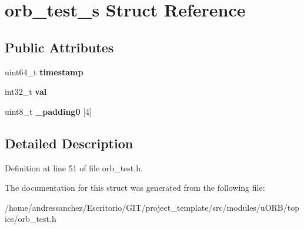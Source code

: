 \hypertarget{structorb__test__s}{}\section{orb\+\_\+test\+\_\+s Struct Reference}
\label{structorb__test__s}
\subsection*{Public Attributes}
\begin{DoxyCompactItemize}
\item 
\mbox{\label{structorb__test__s_a5def43d9b1795f9f5cc367f091d01c10}} 
uint64\+\_\+t {\bfseries timestamp}
\item 
\mbox{\label{structorb__test__s_a7ca7d4e30e3c1d5512222ea29d192dd1}} 
int32\+\_\+t {\bfseries val}
\item 
\mbox{\label{structorb__test__s_a43eb923766090656a5e6a5e4624359d9}} 
uint8\+\_\+t {\bfseries \+\_\+padding0} \mbox{[}4\mbox{]}
\end{DoxyCompactItemize}


\subsection{Detailed Description}


Definition at line 51 of file orb\+\_\+test.\+h.



The documentation for this struct was generated from the following file\+:\begin{DoxyCompactItemize}
\item 
/home/andressanchez/\+Escritorio/\+G\+I\+T/project\+\_\+template/src/modules/u\+O\+R\+B/topics/orb\+\_\+test.\+h\end{DoxyCompactItemize}

